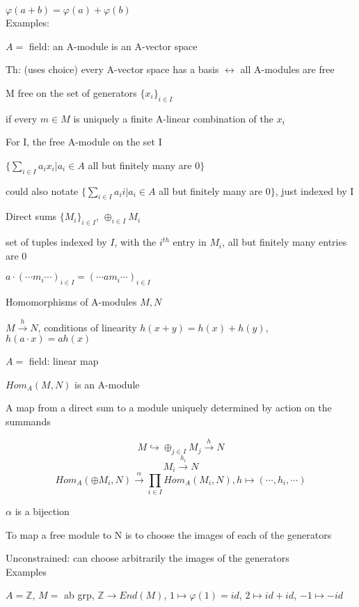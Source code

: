 \documentclass[12pt]{article}
\begin{document}
$\varphi(a + b) = \varphi(a) + \varphi(b)$\\

\noindent
Examples:

$A =$ field: an A-module is an A-vector space

Th: (uses choice) every A-vector space has a basis $\leftrightarrow$ all A-modules are free

\noindent
M free on the set of generators $\{x_i\}_{i \in I}$

if every $m \in M$ is uniquely a finite A-linear combination of the $x_i$

\noindent
For I, the free A-module on the set I

$\{\sum_{i \in I}a_ix_i | a_i \in A$ all but finitely many are 0$\}$

could also notate $\{\sum_{i \in I}a_ii | a_i \in A$ all but finitely many are 0$\}$, just indexed by I

\noindent
Direct sums $\{M_i\}_{i \in I}$, $\oplus_{i \in I}M_i$

set of tuples indexed by $I$, with the $i^{th}$ entry in $M_i$, all but finitely many entries are 0

$a \cdot (\cdots m_i \cdots)_{i \in I} = (\cdots am_i \cdots)_{i \in I}$

\noindent
Homomorphisms of A-modules $M, N$

$M \xrightarrow{h} N$, conditions of linearity $h(x + y) = h(x) + h(y)$, $h(a \cdot x) = a h(x)$

$A =$ field: linear map

$Hom_A(M, N)$ is an A-module

\noindent
A map from a direct sum to a module uniquely determined by action on the summands

$$M \hookrightarrow \oplus_{j \in I}M_j \xrightarrow{h} N$$ $$M_i \xrightarrow{h_i} N$$ $$Hom_A(\oplus M_i, N) \xrightarrow{\alpha} \prod_{i \in I} Hom_A(M_i, N), h \mapsto (\cdots, h_i, \cdots)$$

$\alpha$ is a bijection

To map a free module to N is to choose the images of each of the generators

Unconstrained: can choose arbitrarily the images of the generators\\

\noindent
Examples

\noindent
$A = \mathds{Z}$, $M =$ ab grp, $\mathds{Z} \to End(M)$, $1 \mapsto \varphi(1) = id$, $2 \mapsto id + id$, $-1 \mapsto -id$
\end{document}
